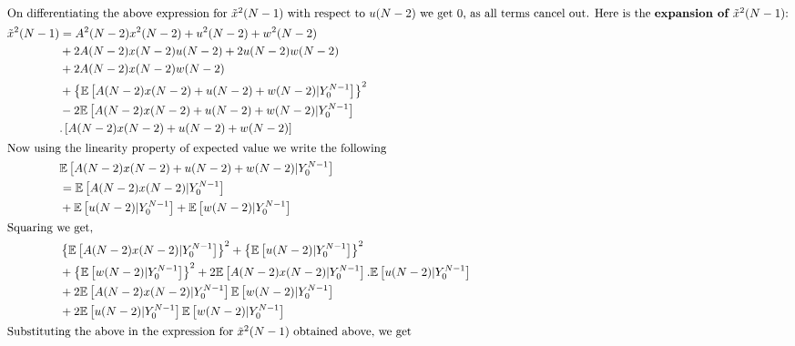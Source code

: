 \documentclass[12pt]{caltech_thesis}
\begin{document}
\begin{align*}
\intertext{On differentiating the above expression for $\tilde{x}^{2}(N-1)$ with respect to $u(N-2)$ we get $0$, as all terms cancel out. Here is the \textbf{expansion of $\tilde{x}^{2}(N-1)$}:}
\tilde{x}^{2}(N-1) &= A^{2}(N-2)x^{2}(N-2) + u^{2}(N-2) + w^{2}(N-2) \\&+ 2A(N-2)x(N-2)u(N-2)+2u(N-2)w(N-2)\\&+2A(N-2)x(N-2)w(N-2) \\&+\left\lbrace\mathbb{E}\left[A(N-2)x(N-2)+u(N-2)+w(N-2)|Y_{0}^{N-1}\right]\right\rbrace^{2}\\&-2\mathbb{E}\left[A(N-2)x(N-2) + u(N-2) + w(N-2) | Y_{0}^{N-1}\right]\\&.\left[A(N-2)x(N-2)+ u(N-2) + w(N-2)\right]\\
\intertext{Now using the linearity property of expected value we write the following}
&\mathbb{E}\left[A(N-2)x(N-2)+u(N-2)+w(N-2)|Y_{0}^{N-1}\right]\\&=\mathbb{E}\left[A(N-2)x(N-2)|Y_{0}^{N-1}\right]\\&+\mathbb{E}\left[u(N-2)|Y_{0}^{N-1}\right]+\mathbb{E}\left[w(N-2)|Y_{0}^{N-1}\right]\\
\intertext{Squaring we get,}
&\left\lbrace\mathbb{E}\left[A(N-2)x(N-2)|Y_{0}^{N-1}\right]\right\rbrace^{2}+\left\lbrace\mathbb{E}\left[u(N-2)|Y_{0}^{N-1}\right]\right\rbrace^{2}\\&+\left\lbrace\mathbb{E}\left[w(N-2)|Y_{0}^{N-1}\right]\right\rbrace^{2}+2\mathbb{E}\left[A(N-2)x(N-2)|Y_{0}^{N-1}\right].\mathbb{E}\left[u(N-2)|Y_{0}^{N-1}\right]\\&+2\mathbb{E}\left[A(N-2)x(N-2)|Y_{0}^{N-1}\right]\mathbb{E}\left[w(N-2)|Y_{0}^{N-1}\right]\\&+2\mathbb{E}\left[u(N-2)|Y_{0}^{N-1}\right]\mathbb{E}\left[w(N-2)|Y_{0}^{N-1}\right]\\
\intertext{Substituting the above in the expression for $\tilde{x}^{2}(N-1)$ obtained above, we get}

\end{align*}
\end{document}
